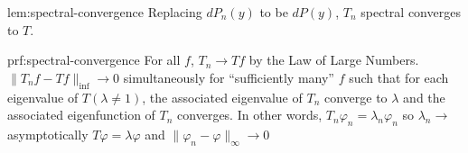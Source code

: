 \documentclass[12pt]{article}
\theoremstyle{plain}
\begin{document}
\begin{lem}{lem:spectral-convergence}
	Replacing $ dP_n(y) $ to be $ dP(y) $, $ T_n $ spectral converges to $ T $.
\end{lem}

\begin{prf}{prf:spectral-convergence}
For all $f$, $T_n \rightarrow Tf$ by the Law of Large Numbers.
$ \|T_nf - Tf\|_{\inf} \rightarrow 0 $ simultaneously for ``sufficiently many'' $ f $ such that for each eigenvalue of $ T (\lambda \neq 1) $, the associated eigenvalue of $T_n$ converge to $\lambda$ and the associated eigenfunction of $T_n$ converges.
In other words,
$ T_n \varphi_n = \lambda_n \varphi_n $ so $ \lambda_n \rightarrow$asymptotically
$T\varphi = \lambda \varphi$ and $ \| \varphi_n- \varphi \|_{\infty} \rightarrow 0$
\end{prf}

{}

\end{document}
